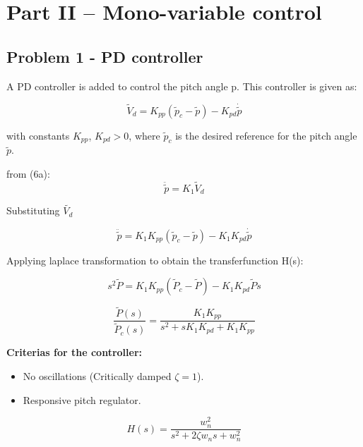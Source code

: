 \section{Part II – Mono-variable control}
\subsection{Problem 1 - PD controller}
A PD controller is added to control the pitch angle p. This controller is given as:

\begin{equation} \label{eq:PD}
    \widetilde{V}_d = K_{pp}(\widetilde{p}_c - \widetilde{p}) - K_{pd} \dot{\widetilde{p}} 
\end{equation}

with constants $K_{pp}$, $K_{pd} > 0$, where $\widetilde{p}_c$ is the desired reference for the pitch angle $\widetilde{p}$.

from (6a):
\begin{equation}
    \ddot{\widetilde{p}} = K_1 {\widetilde{V}_d}    
\end{equation}


Substituting $\widetilde{V_d}$

\begin{equation*}
    \ddot{\widetilde{p}} = K_1 K_{pp}(\widetilde{p}_c - \widetilde{p}) - K_1K_{pd} \dot{\widetilde{p}}    
\end{equation*}




Applying laplace transformation to obtain the transferfunction H(s):

\begin{equation*}
    {s^2}\tilde P = {K_1}{K_{pp}}({{\tilde P}_c} - \tilde P) - {K_1}{K_{pd}} {\tilde P}s
\end{equation*}

\begin{equation}\label{eq:Transferfunction}
\frac{{\tilde P}(s)}{{{{\tilde P}_c}(s)}} = \frac{{{K_1}{K_{pp}}}}{{{s^2} + s{K_1}{K_{pd}} + {K_1}{K_{pp}}}}
\end{equation}


\renewcommand\labelitemi{\tiny$\bullet$}
\textbf{Criterias for the controller:}
\begin{itemize}
\item No oscillations (Critically damped $\zeta = 1$).
\item Responsive pitch regulator.
\end{itemize}

\begin{equation*}
H(s) = \frac{w_n^2}{s^2 + 2\zeta w_ns + w_n^2}
\end{equation*}


